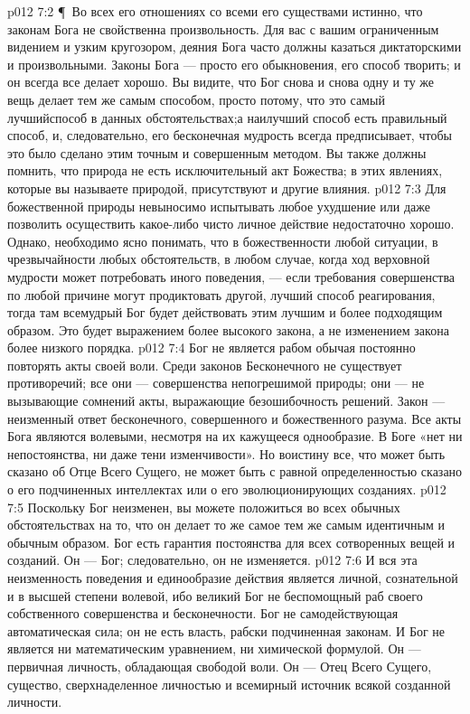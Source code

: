 \vs p012 7:2 \P\ Во всех его отношениях со всеми его существами истинно, что законам Бога не свойственна произвольность. Для вас с вашим ограниченным видением и узким кругозором, деяния Бога часто должны казаться диктаторскими и произвольными. Законы Бога --- просто его обыкновения, его способ творить; и он всегда все делает хорошо. Вы видите, что Бог снова и снова одну и ту же вещь делает тем же самым способом, просто потому, что это самый лучшийспособ в данных обстоятельствах;а наилучший способ есть правильный способ, и, следовательно, его бесконечная мудрость всегда предписывает, чтобы это было сделано этим точным и совершенным методом. Вы также должны помнить, что природа не есть исключительный акт Божества; в этих явлениях, которые вы называете природой, присутствуют и другие влияния.
\vs p012 7:3 Для божественной природы невыносимо испытывать любое ухудшение или даже позволить осуществить какое\hyp{}либо чисто личное действие недостаточно хорошо. Однако, необходимо ясно понимать, что  в божественности любой ситуации, в чрезвычайности любых обстоятельств, в любом случае, когда ход верховной мудрости может потребовать иного поведения, --- если требования совершенства по любой причине могут продиктовать другой, лучший способ реагирования, тогда там всемудрый Бог будет действовать этим лучшим и более подходящим образом. Это будет выражением более высокого закона, а не изменением закона более низкого порядка.
\vs p012 7:4 Бог не является рабом обычая постоянно повторять акты своей воли. Среди законов Бесконечного не существует противоречий; все они --- совершенства непогрешимой природы; они --- не вызывающие сомнений акты, выражающие безошибочность решений. Закон --- неизменный ответ бесконечного, совершенного и божественного разума. Все акты Бога являются волевыми, несмотря на их кажущееся однообразие. В Боге «нет ни непостоянства, ни даже тени изменчивости». Но воистину все, что может быть сказано об Отце Всего Сущего, не может быть с равной определенностью сказано о его подчиненных интеллектах или о его эволюционирующих созданиях.
\vs p012 7:5 Поскольку Бог неизменен, вы можете положиться во всех обычных обстоятельствах на то, что он делает то же самое тем же самым идентичным и обычным образом. Бог есть гарантия постоянства для всех сотворенных вещей и созданий. Он --- Бог; следовательно, он не изменяется.
\vs p012 7:6 И вся эта неизменность поведения и единообразие действия является личной, сознательной и в высшей степени волевой, ибо великий Бог не беспомощный раб своего собственного совершенства и бесконечности. Бог не самодействующая автоматическая сила; он не есть власть, рабски подчиненная законам. И Бог не является ни математическим уравнением, ни химической формулой. Он --- первичная личность, обладающая свободой воли. Он --- Отец Всего Сущего, существо, сверхнаделенное личностью и всемирный источник всякой созданной личности.
